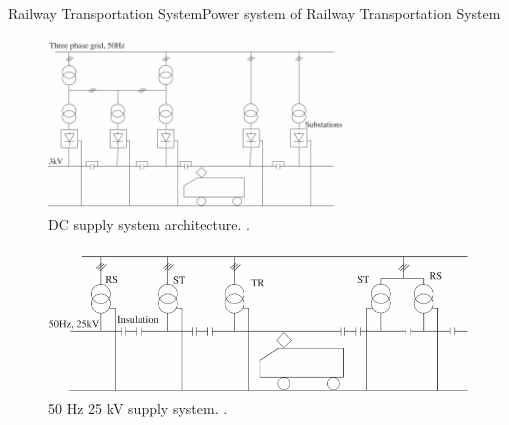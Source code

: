 

\begin{frame}{Railway Transportation System}{Power system of Railway Transportation System}
	\begin{minipage}[t]{0.48\linewidth}
	
	\begin{figure}[ht!]
		\centering
		\includegraphics[width=0.7\textwidth,keepaspectratio]{figures/31.PowerS/abad2016f}
		\caption{\ac{DC} supply system architecture. \cite{abad2016}.}
	\end{figure}
\end{minipage}\hfill
\begin{minipage}[t]{0.48\linewidth}
	
	
	\begin{figure}[ht!]
		\centering
		\includegraphics[width=\textwidth,keepaspectratio]{figures/31.PowerS/abad2016d}
		\caption{50 Hz 25 kV supply system. \cite{abad2016}.}
	\end{figure}



\end{minipage}
\end{frame}
